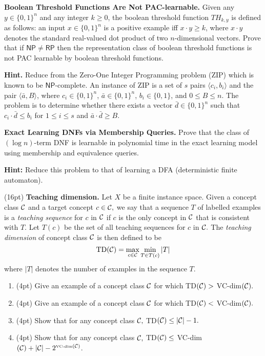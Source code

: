 \documentclass[11pt]{article}
\DeclareMathOperator{\1}{\mathbbm{1}}
\begin{document}
\begin{problem} [15 pts] \textbf{Boolean Threshold Functions Are Not PAC-learnable.} Given any $y \in \{0,1\}^n$ and any integer $k \geq 0$, the boolean threshold function $TH_{k,y}$ is defined as follows: an input $x \in \{0,1\}^n$ is a positive example iff $x \cdot y \geq k$, where $x \cdot y$ denotes the standard real-valued dot product of two $n$-dimensional vectors. Prove that if $\mathsf{NP} \neq \mathsf{RP}$ then the representation class of boolean threshold functions is not PAC learnable by boolean threshold functions.

\textbf{Hint.} Reduce from the Zero-One Integer Programming problem (ZIP) which is known to be $\mathsf{NP}$-complete. An instance of ZIP is a set of $s$ pairs $\langle c_i, b_i \rangle$ and the pair $\langle \bar{a}, B \rangle$, where $c_i \in \{0,1\}^n$, $\bar{a} \in \{0,1\}^n$, $b_i \in \{0,1\}$, and $0 \leq B \leq n$. The problem is to determine whether there exists a vector $\bar{d} \in \{0,1\}^n$ such that $c_i \cdot \bar{d} \leq b_i$ for $1 \leq i \leq s$ and $\bar{a} \cdot \bar{d} \geq B$.

\end{problem}


\begin{problem}[15 pts] \textbf{Exact Learning DNFs via Membership Queries.} Prove that the class of $(\log n)$-term DNF is learnable in polynomial time in the exact learning model using membership and equivalence queries.

\textbf{Hint:} Reduce this problem to that of learning a DFA (deterministic finite automaton).
\end{problem}


\begin{problem} (16pt) \textbf{Teaching dimension.} 
Let $X$ be a finite instance space.  Given a concept class ${\cal C}$ and a
target concept $c \in {\cal C},$  we say that a sequence $T$ of labelled
examples is a {\em teaching sequence} for $c$ in ${\cal C}$ if $c$ is the only
concept in ${\cal C}$ that is consistent with $T$. Let $T(c)$ be the set of all
teaching sequences for $c$ in ${\cal C}.$  The {\em teaching dimension} of
concept class ${\cal C}$ is then defined to be
%
\[ \mbox{TD}({\cal C}) = \max_{c \in {\cal C}} \min_{T \in T(c)} |T| \] 
%
where $|T|$ denotes the number of examples in the sequence $T$.
\begin{enumerate}
\item (4pt) Give an example of a concept class ${\cal C}$ for which TD$({\cal C})
> $ VC-dim$({\cal C}).$
\item (4pt) Give an example of a concept class ${\cal C}$ for which TD$({\cal C})
< $ VC-dim$({\cal C}).$
\item (4pt) Show that for any concept class ${\cal C},$ TD$({\cal C}) \leq |{\cal
C}|-1.$
\item (4pt) Show that for any concept class ${\cal C},$ TD$({\cal C}) \leq $
VC-dim$({\cal C}) + |{\cal C}|- 2^{\mbox{\tiny{VC-dim}} ({\cal C})}$.
\end{enumerate}

\end{problem}
\end{document}
